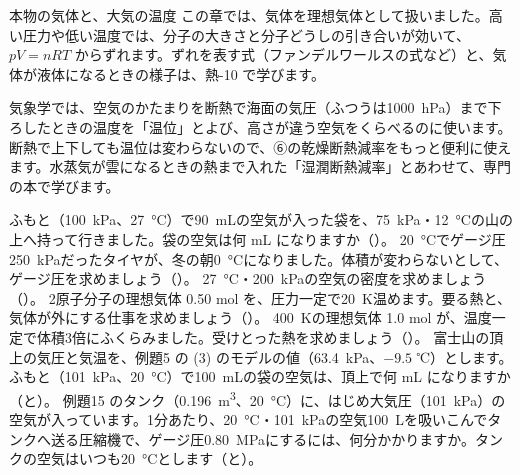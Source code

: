 \begin{phsaki}{本物の気体と、大気の温度}
この章では、気体を理想気体として扱いました。高い圧力や低い温度では、分子の大きさと分子どうしの引き合いが効いて、$pV=nRT$ からずれます。ずれを表す式（ファンデルワールスの式など）と、気体が液体になるときの様子は、熱-10 で学びます。

気象学では、空気のかたまりを断熱で海面の気圧（ふつうは\qty{1000}{hPa}）まで下ろしたときの温度を「温位」とよび、高さが違う空気をくらべるのに使います。断熱で上下しても温位は変わらないので、⑥の乾燥断熱減率をもっと便利に使えます。水蒸気が雲になるときの熱まで入れた「湿潤断熱減率」とあわせて、専門の本で学びます。
\end{phsaki}

\bkendproblems
{}
\bkproblem ふもと（\qty{100}{kPa}、\qty{27}{\celsius}）で\qty{90}{mL}の空気が入った袋を、\qty{75}{kPa}・\qty{12}{\celsius}の山の上へ持って行きました。袋の空気は何 mL になりますか（）。
\bkproblem \qty{20}{\celsius}でゲージ圧\qty{250}{kPa}だったタイヤが、冬の朝\qty{0}{\celsius}になりました。体積が変わらないとして、ゲージ圧を求めましょう（）。
\bkproblem \qty{27}{\celsius}・\qty{200}{kPa}の空気の密度を求めましょう（）。
\bkproblem 2原子分子の理想気体 0.50 mol を、圧力一定で\qty{20}{K}温めます。要る熱と、気体が外にする仕事を求めましょう（）。
\bkproblem \qty{400}{K}の理想気体 1.0 mol が、温度一定で体積3倍にふくらみました。受けとった熱を求めましょう（）。
\bkproblem 富士山の頂上の気圧と気温を、例題5 の (3) のモデルの値（\qty{63.4}{kPa}、$-9.5$ ℃）とします。ふもと（\qty{101}{kPa}、\qty{20}{\celsius}）で\qty{100}{mL}の袋の空気は、頂上で何 mL になりますか（と）。
\bkproblem 例題15 のタンク（\qty{0.196}{m^3}、\qty{20}{\celsius}）に、はじめ大気圧（\qty{101}{kPa}）の空気が入っています。1分あたり、\qty{20}{\celsius}・\qty{101}{kPa}の空気\qty{100}{L}を吸いこんでタンクへ送る圧縮機で、ゲージ圧\qty{0.80}{MPa}にするには、何分かかりますか。タンクの空気はいつも\qty{20}{\celsius}とします（と）。
